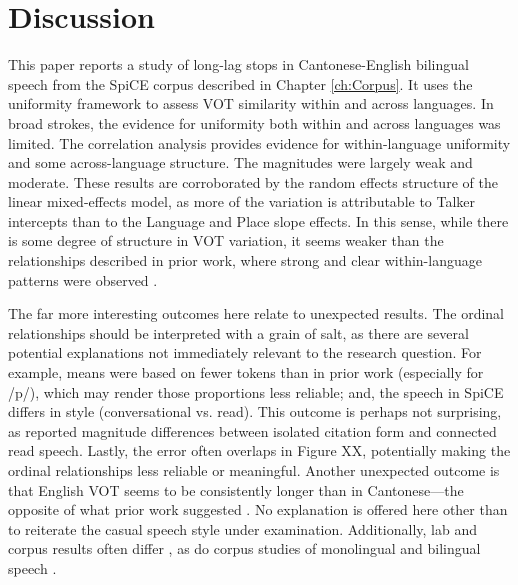 \section{Discussion}

This paper reports a study of long-lag stops in Cantonese-English bilingual speech from the SpiCE corpus described in Chapter \ref{ch:Corpus}. It uses the uniformity framework to assess VOT similarity within and across languages. In broad strokes, the evidence for uniformity both within and across languages was limited. The correlation analysis provides evidence for within-language uniformity and some across-language structure. The magnitudes were largely weak and moderate. These results are corroborated by the random effects structure of the linear mixed-effects model, as more of the variation is attributable to Talker intercepts than to the Language and Place slope effects. In this sense, while there is some degree of structure in VOT variation, it seems weaker than the relationships described in prior work, where strong and clear within-language patterns were observed \citep{chodroff_2017_structure, chodroff_2019_l2}.

The far more interesting outcomes here relate to unexpected results. The ordinal relationships should be interpreted with a grain of salt, as there are several potential explanations not immediately relevant to the research question. For example, means were based on fewer tokens than in prior work (especially for /p/), which may render those proportions less reliable; and, the speech in SpiCE differs in style (conversational vs. read). This outcome is perhaps not surprising, as \citet{chodroff_2017_structure} reported magnitude differences between isolated citation form and connected read speech. Lastly, the error often overlaps in Figure XX, potentially making the ordinal relationships less reliable or meaningful. Another unexpected outcome is that English VOT seems to be consistently longer than in Cantonese---the opposite of what prior work suggested \citep{clumeck_1981_cantonese, lisker_1964_vot}. No explanation is offered here other than to reiterate the casual speech style under examination. Additionally, lab and corpus results often differ \citep{gahl_2012_reduce,chodroff_2017_structure}, as do corpus studies of monolingual and bilingual speech \cite{johnson_2019_probabilistic}. 

